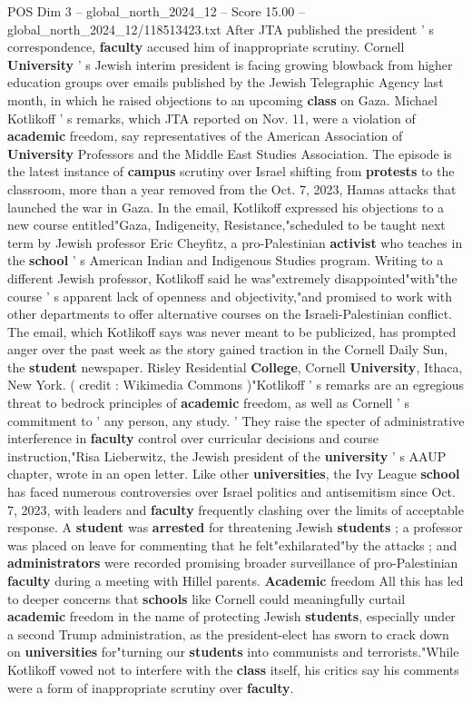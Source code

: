\begin{textsample}{POS Dim 3 – global\_north\_2024\_12 – Score 15.00 – global\_north\_2024\_12/118513423.txt}  \label{ex:f3_pos_214}
After JTA published the president ' s correspondence, \textbf{faculty} accused him of inappropriate scrutiny.
Cornell \textbf{University} ' s Jewish interim president is facing growing blowback from higher education groups over emails published by the Jewish Telegraphic Agency last month, in which he raised objections to an upcoming \textbf{class} on Gaza.
Michael Kotlikoff ' s remarks, which JTA reported on Nov. 11, were a violation of \textbf{academic} freedom, say representatives of the American Association of \textbf{University} Professors and the Middle East Studies Association.
The episode is the latest instance of \textbf{campus} scrutiny over Israel shifting from \textbf{protests} to the classroom, more than a year removed from the Oct. 7, 2023, Hamas attacks that launched the war in Gaza.
In the email, Kotlikoff expressed his objections to a new course entitled"Gaza, Indigeneity, Resistance,"scheduled to be taught next term by Jewish professor Eric Cheyfitz, a pro-Palestinian \textbf{activist} who teaches in the \textbf{school} ' s American Indian and Indigenous Studies program.
Writing to a different Jewish professor, Kotlikoff said he was"extremely disappointed"with"the course ' s apparent lack of openness and objectivity,"and promised to work with other departments to offer alternative courses on the Israeli-Palestinian conflict.
The email, which Kotlikoff says was never meant to be publicized, has prompted anger over the past week as the story gained traction in the Cornell Daily Sun, the \textbf{student} newspaper.
Risley Residential \textbf{College}, Cornell \textbf{University}, Ithaca, New York. ( credit : Wikimedia Commons )"Kotlikoff ' s remarks are an egregious threat to bedrock principles of \textbf{academic} freedom, as well as Cornell ' s commitment to ' any person, any study. ' They raise the specter of administrative interference in \textbf{faculty} control over curricular decisions and course instruction,"Risa Lieberwitz, the Jewish president of the \textbf{university} ' s AAUP chapter, wrote in an open letter.
Like other \textbf{universities}, the Ivy League \textbf{school} has faced numerous controversies over Israel politics and antisemitism since Oct. 7, 2023, with leaders and \textbf{faculty} frequently clashing over the limits of acceptable response.
A \textbf{student} was \textbf{arrested} for threatening Jewish \textbf{students} ; a professor was placed on leave for commenting that he felt"exhilarated"by the attacks ; and \textbf{administrators} were recorded promising broader surveillance of pro-Palestinian \textbf{faculty} during a meeting with Hillel parents. \textbf{Academic} freedom All this has led to deeper concerns that \textbf{schools} like Cornell could meaningfully curtail \textbf{academic} freedom in the name of protecting Jewish \textbf{students}, especially under a second Trump administration, as the president-elect has sworn to crack down on \textbf{universities} for"turning our \textbf{students} into communists and terrorists."While Kotlikoff vowed not to interfere with the \textbf{class} itself, his critics say his comments were a form of inappropriate scrutiny over \textbf{faculty}.

\end{textsample}
